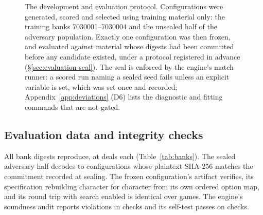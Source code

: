 \begin{figure}[!ht]
\caption{The development and evaluation protocol. Configurations were generated, scored and selected
using training material only: the training banks 7030001--7030004 and the unsealed half of the
adversary population. Exactly one configuration was then frozen, and evaluated against material
whose digests had been committed before any candidate existed, under a protocol registered in
advance (\S\ref{sec:evaluation-seal}). The seal is enforced by the engine's match runner: a scored
run naming a sealed seed fails unless an explicit variable is set, which was set once and recorded;
Appendix~\ref{app:deviations} (D6) lists the diagnostic and fitting commands that are not gated.}
\label{fig:protocol}
\end{figure}

\subsection{Evaluation data and integrity checks}
\label{sec:design-material}

All \vsevenBanks{} bank digests reproduce, at \vsevenBankDeals{} deals each (Table~\ref{tab:banks}). The sealed adversary half
decodes to \vsevenSealedRows{} configurations whose plaintext SHA-256 matches the commitment recorded
at sealing. The frozen configuration's artifact verifies, its specification rebuilding character for
character from its own ordered option map, and its round trip with search enabled is identical over
\vsevenRtwoaGames{} games. The engine's soundness audit reports \vsevenVerifyViolations{} violations
in \vsevenVerifyChecks{} checks and its self-test passes on \vsevenSelftestChecks{} checks.

\begin{table}[!ht]\centering
\caption{The deal banks. Each digest was recomputed before any cell was played, by folding the six
dealt hands and the dealer of every deal into a rolling hash without constructing a policy or playing
a game. The committed digests had been computed by a different build of the engine at sealing time,
so agreement is between two binaries as well as two dates.}
\label{tab:banks}
{\tabfont}
\end{table}

